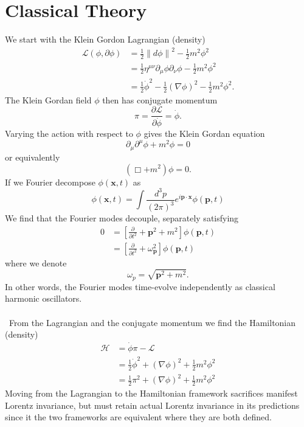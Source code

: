 \documentclass[12 pt]{article}
\newcommand{\B}[1]{\mathbf{#1}}
\newcommand{\LA}{\mathcal{L}}
\newcommand{\PA}[2]{\frac{\partial #1}{\partial #2}}
\numberwithin{equation}{section}
\begin{document}
\section{Classical Theory}
We start with the Klein Gordon Lagrangian (density) \begin{align*}
    \LA(\phi, \partial \phi) & = \frac{1}{2}\left\| d \phi \right\|^2 - \frac{1}{2} m^2 \phi^2 \\
    \ & = \frac{1}{2} \eta^{\mu \nu} \partial_\mu \phi \partial_\nu \phi - \frac{1}{2} m^2 \phi^2 \\
    \ & = \frac{1}{2} \dot{\phi}^2 - \frac{1}{2} (\nabla \phi)^2 - \frac{1}{2} m^2 \phi^2.
\end{align*}
The Klein Gordan field $\phi$ then has conjugate momentum \begin{equation*}
\pi = \PA{\LA}{\dot{\phi}} = \dot{\phi}.
\end{equation*}
Varying the action with respect to $\phi$ gives the Klein Gordan equation \begin{equation*}
\partial_\mu \partial^\mu \phi + m^2 \phi = 0
\end{equation*}
or equivalently \begin{equation*}
    (\Box  + m^2)\phi = 0.
\end{equation*}
If we Fourier decompose $\phi(\B{x},t)$ as \begin{equation*}
\phi(\B{x},t) = \int \frac{d^3 p}{(2\pi)^3} e^{i \B{p} \cdot \B{x}} \phi(\B{p}, t)
\end{equation*}
We find that the Fourier modes decouple, separately satisfying \begin{align*}
0 & = \left[ \PA{}{t^2} + \B{p}^2 + m^2 \right] \phi(\B{p},t) \\
\ & = \left[ \PA{}{t^2} + \omega^2_{\B{p}}  \right] \phi(\B{p},t)
\end{align*}
where we denote \begin{equation*}
\omega_p = \sqrt{\B{p}^2 + m^2}.
\end{equation*}
In other words, the Fourier modes time-evolve independently as classical harmonic oscillators.\\
\\
\
From the Lagrangian and the conjugate momentum we find the Hamiltonian (density) \begin{align*}
\mathcal{H} & = \dot{\phi} \pi - \LA \\
\ & = \frac{1}{2} \dot{\phi}^2 + (\nabla \phi)^2 + \frac{1}{2} m^2 \phi^2 \\
\ & = \frac{1}{2} \pi^2 + (\nabla \phi)^2 + \frac{1}{2} m^2 \phi^2
\end{align*}
Moving from the Lagrangian to the Hamiltonian framework sacrifices manifest Lorentz invariance, but must retain actual Lorentz invariance in its predictions since it the two frameworks are equivalent where they are both defined.
\end{document}
